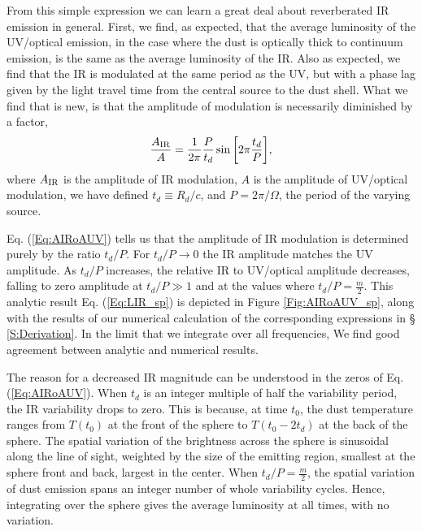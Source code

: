 From this simple expression we can learn a great deal about reverberated IR emission in general.
First, we find, as expected, that the average luminosity of the UV/optical emission, in the
case where the dust is optically thick to continuum emission, is the same as the average luminosity of the IR. Also as
expected, we find that the IR is modulated at the same period as the UV, but
with a phase lag given by the light travel time from the central source to the
dust shell. What we find that is new, is that the amplitude of modulation is
necessarily diminished by a factor,
\begin{eqnarray}
\frac{A_{\rm{IR}}}{A} = \frac{1}{2 \pi}\frac{P}{t_d} \sin{\left[ 2 \pi\frac{t_d}{P} \right]},
\label{Eq:AIRoAUV}
\end{eqnarray}
where $A_{\rm{IR}}$ is the amplitude of IR modulation, $A$ is the amplitude of
UV/optical modulation, we have defined $t_d \equiv R_d/c$, and $P = 2 \pi
/\Omega$, the period of the varying source. 

Eq. (\ref{Eq:AIRoAUV}) tells us that the amplitude of IR modulation is
determined purely by the ratio $t_d/P$. For $t_d/P \rightarrow 0$ the IR
amplitude matches the UV amplitude. As $t_d/P$ increases, the relative IR to
UV/optical amplitude decreases, falling to  zero amplitude at $t_d/P  \gg 1$
and at the values where $t_d/P = \frac{m}{2}$. This analytic result Eq.
(\ref{Eq:LIR_sp}) is depicted in Figure \ref{Fig:AIRoAUV_sp}, along with the
results of our numerical calculation of the corresponding expressions in \S
\ref{S:Derivation}. In the limit that we integrate over all frequencies, We
find good agreement between analytic and numerical results.




The reason for a decreased IR magnitude can be understood in the zeros of Eq.
(\ref{Eq:AIRoAUV}). When $t_d$ is an integer multiple of half the variability
period, the IR variability drops to zero. This is because, at time $t_0$, the
dust temperature ranges from $T(t_0)$ at the front of the sphere to $T(t_0 -
2t_d)$ at the back of the sphere. The spatial variation of the brightness
across the sphere is sinusoidal along the line of sight, weighted by the size
of the emitting region, smallest at the sphere front and back, largest in the
center. When $t_d/P = \frac{m}{2}$, the spatial variation of dust emission spans
an integer number of whole variability cycles. Hence, integrating over the sphere
gives the average luminosity at all times, with no variation. 

